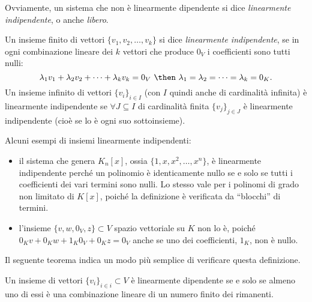 Ovviamente, un sistema che non è linearmente dipendente si dice \emph{linearmente indipendente}, o anche \emph{libero}.

\begin{definizione} \label{d:indipendenza-lineare}
	Un insieme finito di vettori $\{  v_1,  v_2,\dots,  v_k\}$ si dice \emph{linearmente indipendente}, se in ogni combinazione lineare dei $k$ vettori che produce $0_V$ i coefficienti sono tutti nulli:
	\begin{equation*}
		\lambda_1  v_1+\lambda_2  v_2+\dots+\lambda_k  v_k=0_V\ \then\ \lambda_1=\lambda_2=\dots=\lambda_k=0_K.
	\end{equation*}
	Un insieme infinito di vettori $\{  v_i\}_{i\in I}$ (con $I$ quindi anche di cardinalità infinita) è linearmente indipendente se $\forall J\subseteq I$ di cardinalità finita $\{  v_j\}_{j\in J}$ è linearmente indipendente (cioè se lo è ogni suo sottoinsieme).
\end{definizione}
Alcuni esempi di insiemi linearmente indipendenti:
\begin{itemize}
	\item il sistema che genera $K_n[x]$, ossia $\{1,x,x^2,\dots,x^n\}$, è linearmente indipendente perché un polinomio è identicamente nullo se e solo se tutti i coefficienti dei vari termini sono nulli.
		Lo stesso vale per i polinomi di grado non limitato di $K[x]$, poiché la definizione è verificata da ``blocchi'' di termini.
	\item l'insieme $\{  v,  w,0_V,  z\}\subset V$ spazio vettoriale su $K$ non lo è, poiché $0_K  v+0_K  w+1_K0_V+0_K  z=0_V$ anche se uno dei coefficienti, $1_K$, non è nullo.
\end{itemize}
Il seguente teorema indica un modo più semplice di verificare questa definizione.
\begin{teorema}
	Un insieme di vettori $\{  v_i\}_{i\in i}\subset V$ è linearmente dipendente se e solo se almeno uno di essi è una combinazione lineare di un numero finito dei rimanenti.
\end{teorema}
